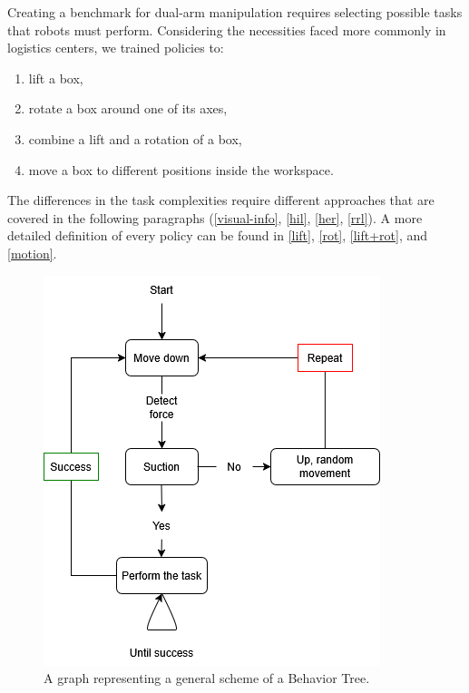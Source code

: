 \documentclass[letterpaper, 10 pt, conference]{ieeeconf}  %
\begin{document}
Creating a benchmark for dual-arm manipulation requires selecting possible tasks that robots must perform.
Considering the necessities faced more commonly in logistics centers, we trained policies to:

\begin{enumerate}
    \item lift a box,
    \item rotate a box around one of its axes,
    \item combine a lift and a rotation of a box,
    \item move a box to different positions inside the workspace.
\end{enumerate}

The differences in the task complexities require different approaches that are covered in the following paragraphs (\cref{visual-info}, \cref{hil}, \cref{her}, \cref{rrl}). A more detailed definition of every policy can be found in \cref{lift}, \cref{rot}, \cref{lift+rot}, and \cref{motion}.

\begin{figure}[t]
    \centering
    \includegraphics[width=0.99\linewidth]{images/BT_gen.drawio.png}
    \caption{A graph representing a general scheme of a Behavior Tree.}
    \label{BT-strategy}
\end{figure}
\end{document}
